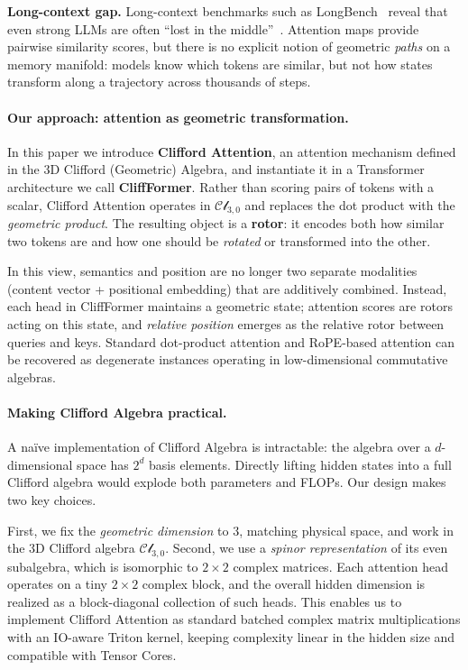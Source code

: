 \documentclass{article}
\theoremstyle{plain}
\theoremstyle{definition}
\theoremstyle{remark}
\newcommand{\cliff}{\mathcal{Cl}}
\begin{document}
\textbf{Long-context gap.} Long-context benchmarks such as LongBench~\cite{bai2023longbench} reveal that even strong LLMs are often ``lost in the middle''~\cite{liu2024lost}. Attention maps provide pairwise similarity scores, but there is no explicit notion of geometric \emph{paths} on a memory manifold: models know which tokens are similar, but not how states transform along a trajectory across thousands of steps.

\paragraph{Our approach: attention as geometric transformation.}
In this paper we introduce \textbf{Clifford Attention}, an attention mechanism defined in the 3D Clifford (Geometric) Algebra, and instantiate it in a Transformer architecture we call \textbf{CliffFormer}. Rather than scoring pairs of tokens with a scalar, Clifford Attention operates in $\cliff_{3,0}$ and replaces the dot product with the \emph{geometric product}. The resulting object is a \textbf{rotor}: it encodes both how similar two tokens are and how one should be \emph{rotated} or transformed into the other.

In this view, semantics and position are no longer two separate modalities (content vector + positional embedding) that are additively combined. Instead, each head in CliffFormer maintains a geometric state; attention scores are rotors acting on this state, and \emph{relative position} emerges as the relative rotor between queries and keys. Standard dot-product attention and RoPE-based attention can be recovered as degenerate instances operating in low-dimensional commutative algebras.

\paragraph{Making Clifford Algebra practical.}
A naïve implementation of Clifford Algebra is intractable: the algebra over a $d$-dimensional space has $2^d$ basis elements. Directly lifting hidden states into a full Clifford algebra would explode both parameters and FLOPs. Our design makes two key choices.

First, we fix the \emph{geometric dimension} to $3$, matching physical space, and work in the 3D Clifford algebra $\cliff_{3,0}$. Second, we use a \emph{spinor representation} of its even subalgebra, which is isomorphic to $2 \times 2$ complex matrices. Each attention head operates on a tiny $2 \times 2$ complex block, and the overall hidden dimension is realized as a block-diagonal collection of such heads. This enables us to implement Clifford Attention as standard batched complex matrix multiplications with an IO-aware Triton kernel, keeping complexity linear in the hidden size and compatible with Tensor Cores.
\end{document}
